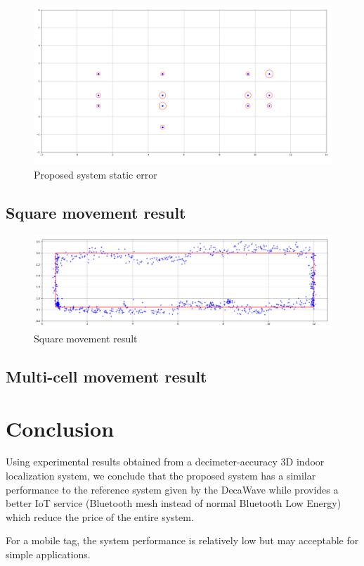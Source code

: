 \documentclass[\main/main.tex]{subfiles}
\begin{document}
\begin{figure}[H]     
    \centering
    \includegraphics[width=1\textwidth]{result_static.png}
    \caption{Proposed system static error}
    \label{fig:proposed_rms_error}
\end{figure}

\subsection{Square movement result}

\begin{figure}[H]     
    \centering
    \includegraphics[width=1\textwidth]{result_square.png}
    \caption{Square movement result}
    \label{fig:result_square}
\end{figure}

\subsection{Multi-cell movement result}

\section{Conclusion}
Using experimental results obtained from a decimeter-accuracy 3D indoor localization system, we conclude that the proposed system has a similar performance to the reference system given by the DecaWave while provides a better IoT service (Bluetooth mesh instead of normal Bluetooth Low Energy) which reduce the price of the entire system.

For a mobile tag, the system performance is relatively low but may acceptable for simple applications.
\end{document}
